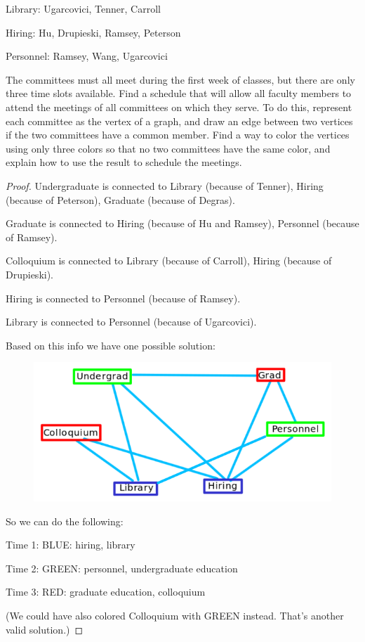 \documentclass[14pt]{extarticle}
\begin{document}
Library: Ugarcovici, Tenner, Carroll

Hiring: Hu, Drupieski, Ramsey, Peterson

Personnel: Ramsey, Wang, Ugarcovici

The committees must all meet during the first week of classes, but there are
only three time slots available. Find a schedule that will allow all faculty
members to attend the meetings of all committees on which they serve. To do
this, represent each committee as the vertex of a graph, and draw an edge
between two vertices if the two committees have a common member. Find a way to
color the vertices using only three colors so that no two committees have the
same color, and explain how to use the result to schedule the meetings.

\begin{proof}
    Undergraduate is connected to Library (because of Tenner), Hiring (because of
    Peterson), Graduate (because of Degras).

    Graduate is connected to Hiring (because of Hu and Ramsey), Personnel (because
    of Ramsey).

    Colloquium is connected to Library (because of Carroll), Hiring (because of
    Drupieski).

    Hiring is connected to Personnel (because of Ramsey).

    Library is connected to Personnel (because of Ugarcovici).

    Based on this info we have one possible solution:
    \begin{figure}[ht!]
        \centering
        \includegraphics[scale=0.5]{../images/1.4.16.sol.png}
    \end{figure}

    So we can do the following:

    Time 1: BLUE: hiring, library

    Time 2: GREEN: personnel, undergraduate education

    Time 3: RED: graduate education, colloquium

    (We could have also colored Colloquium with GREEN instead. That's another
    valid solution.)
\end{proof}
\end{document}
